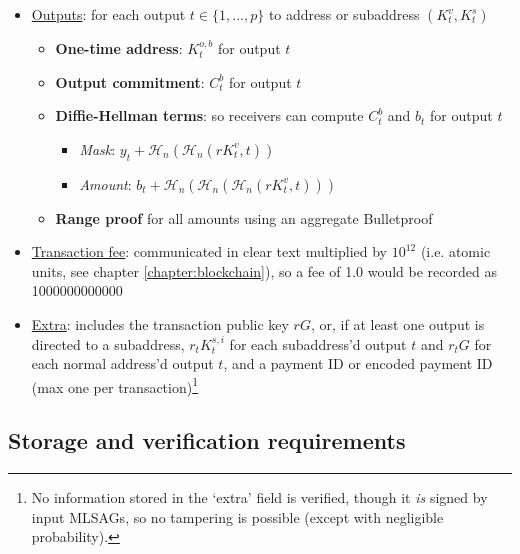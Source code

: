\begin{itemize}
    \item \underline{Outputs}: for each output $t \in \{1,...,p\}$ to address or subaddress $(K^v_t,K^s_t)$
    \begin{itemize}
        \item \textbf{One-time address}: $K^{o,b}_t$ for output $t$
        \item \textbf{Output commitment}: $C^{b}_t$ for output $t$
        \item \textbf{Diffie-Hellman terms}: so receivers can compute $C^{b}_t$ and $b_t$ for output $t$
        \begin{itemize}
            \item \textit{Mask}: $y_t + \mathcal{H}_n(\mathcal{H}_n(r K^v_t,t))$
            \item \textit{Amount}: $b_t + \mathcal{H}_n(\mathcal{H}_n(\mathcal{H}_n(r K^v_t,t)))$
        \end{itemize}
        \item \textbf{Range proof} for all amounts using an aggregate Bulletproof
    \end{itemize}
    \item \underline{Transaction fee}: communicated in clear text multiplied by $10^{12}$ (i.e. atomic units, see chapter \ref{chapter:blockchain}), so a fee of 1.0 would be recorded as 1000000000000
    \item \underline{Extra}: includes the transaction public key $r G$, or, if at least one output is directed to a subaddress, $r_t K^{s,i}_t$ for each subaddress'd output $t$ and $r_t G$ for each normal address'd output $t$, and a payment ID or encoded payment ID (max one per transaction)\footnote{No information stored in the `extra' field is verified, though it {\em is} signed by input MLSAGs, so no tampering is possible (except with negligible probability).}
\end{itemize}

\newpage
\subsection{Storage and verification requirements}

